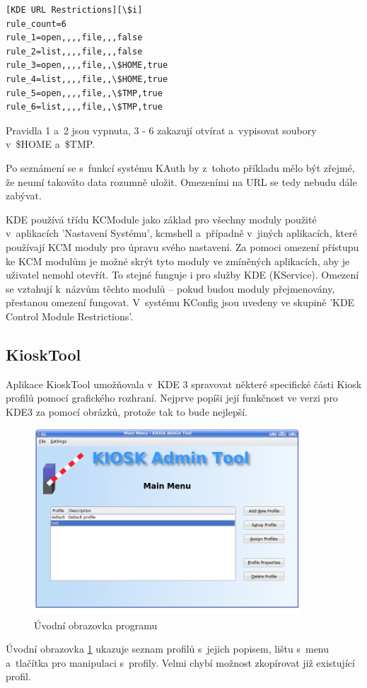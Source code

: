 \begin{mylisting}
\caption{Ukázka zápisu omezení URL}
\label{url_syntax}
\begin{lstlisting}
[KDE URL Restrictions][\$i]
rule_count=6
rule_1=open,,,,file,,,false
rule_2=list,,,,file,,,false
rule_3=open,,,,file,,\$HOME,true
rule_4=list,,,,file,,\$HOME,true
rule_5=open,,,,file,,\$TMP,true
rule_6=list,,,,file,,\$TMP,true
\end{lstlisting}
\end{mylisting}
Pravidla 1 a~2 jsou vypnuta, 3 - 6 zakazují otvírat a~vypisovat soubory
v~\$HOME a~\$TMP.

Po seznámení se s~funkcí systému KAuth by z~tohoto příkladu mělo být zřejmé, že neumí takováto data rozumně uložit. Omezeními na URL se tedy nebudu dále zabývat.

KDE používá třídu KCModule jako základ pro všechny moduly použité v~aplikacích 'Nastavení Systému', kcmshell a~případně v~jiných aplikacích, které používají KCM moduly pro úpravu svého nastavení. Za pomoci omezení přístupu ke KCM modulům je možné skrýt tyto moduly ve zmíněných aplikacích, aby je uživatel nemohl otevřít. To stejné funguje i pro služby KDE (KService). Omezení se vztahují k~názvům těchto modulů -- pokud budou moduly přejmenovány, přestanou omezení fungovat. V~systému KConfig jsou uvedeny ve skupině 'KDE Control Module Restrictions'.

\subsection{KioskTool}
Aplikace KioskTool umožňovala v~KDE 3 spravovat některé specifické části Kiosk profilů pomocí grafického rozhraní. Nejprve popíši její funkčnost ve verzi pro KDE3 za pomocí obrázků, protože tak to bude nejlepší.

\begin{figure}[h]
    \centering
    \includegraphics[width=10cm]{obrazky/KioskToolKDE3/uvodni_obrazovka.png}
    \caption{Úvodní obrazovka programu}
    \label{fig:kt3_uvodni}
\end{figure}
Úvodní obrazovka \ref{fig:kt3_uvodni} ukazuje seznam profilů s~jejich popisem, lištu s~menu a~tlačítka pro manipulaci s~profily. Velmi chybí možnost zkopírovat již existující profil.

